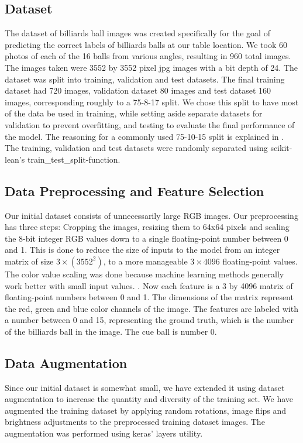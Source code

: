\documentclass{article}
\begin{document}
\subsection{Dataset}
\label{sec:dataset}
The dataset of billiards ball images was created specifically for the goal of predicting the correct labels of billiards balls at our table location.
We took 60 photos of each of the 16 balls from various angles, resulting in 960 total images. The images taken were 3552 by 3552 pixel jpg images 
with a bit depth of 24. The dataset was split into training, validation and test datasets. The final training dataset had 720 images, 
validation dataset 80 images and test dataset 160 images, corresponding roughly to a 75-8-17 split. We chose this split to have most of the data 
be used in training, while setting aside separate datasets for validation to prevent overfitting, and testing to evaluate the final 
performance of the model. The reasoning for a commonly used 75-10-15 split is explained in \cite{josephOptimalRatioData2022}. The training, 
validation and test datasets were randomly separated using scikit-lean's train\_test\_split-function.

\subsection{Data Preprocessing and Feature Selection}
\label{sec:data_preprocessing}
Our initial dataset consists of unnecessarily large RGB images. Our preprocessing has three steps: Cropping the images, resizing them to 64x64 pixels 
and scaling the 8-bit integer RGB values down to a single floating-point number between 0 and 1. This is done to reduce the size of inputs to the model 
from an integer matrix of size $3\times(3552^2)$, to a more manageable $3\times 4096$ floating-point values. The color value scaling was done because machine
learning methods generally work better with small input values. \cite{ImportanceFeatureScaling}. Now each feature is a 3 by 4096 matrix of floating-point
numbers between 0 and 1. The dimensions of the matrix represent the red, green and blue color channels of the image. The features are labeled with a number 
between 0 and 15, representing the ground truth, which is the number of the billiards ball in the image. The cue ball is number 0.

\subsection{Data Augmentation}
\label{sec:data_augmentation}
Since our initial dataset is somewhat small, we have extended it using dataset augmentation to increase the quantity 
and diversity of the training set. We have augmented the training dataset by applying random rotations, 
image flips and brightness adjustments to the preprocessed training dataset images. The augmentation was performed using keras' layers utility.
\end{document}

